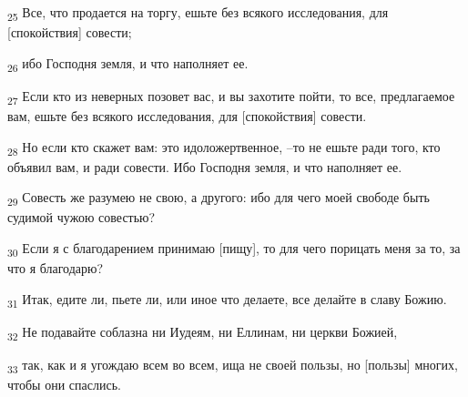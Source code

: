 \begin{tcolorbox}
\textsubscript{25} Все, что продается на торгу, ешьте без всякого исследования, для [спокойствия] совести;
\end{tcolorbox}
\begin{tcolorbox}
\textsubscript{26} ибо Господня земля, и что наполняет ее.
\end{tcolorbox}
\begin{tcolorbox}
\textsubscript{27} Если кто из неверных позовет вас, и вы захотите пойти, то все, предлагаемое вам, ешьте без всякого исследования, для [спокойствия] совести.
\end{tcolorbox}
\begin{tcolorbox}
\textsubscript{28} Но если кто скажет вам: это идоложертвенное, --то не ешьте ради того, кто объявил вам, и ради совести. Ибо Господня земля, и что наполняет ее.
\end{tcolorbox}
\begin{tcolorbox}
\textsubscript{29} Совесть же разумею не свою, а другого: ибо для чего моей свободе быть судимой чужою совестью?
\end{tcolorbox}
\begin{tcolorbox}
\textsubscript{30} Если я с благодарением принимаю [пищу], то для чего порицать меня за то, за что я благодарю?
\end{tcolorbox}
\begin{tcolorbox}
\textsubscript{31} Итак, едите ли, пьете ли, или иное что делаете, все делайте в славу Божию.
\end{tcolorbox}
\begin{tcolorbox}
\textsubscript{32} Не подавайте соблазна ни Иудеям, ни Еллинам, ни церкви Божией,
\end{tcolorbox}
\begin{tcolorbox}
\textsubscript{33} так, как и я угождаю всем во всем, ища не своей пользы, но [пользы] многих, чтобы они спаслись.
\end{tcolorbox}

